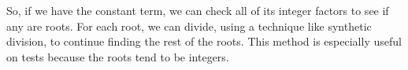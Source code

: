 \noindent
So, if we have the constant term, we can check all of its integer factors to see if any are roots. For each root, we can divide, using a technique like synthetic division, to continue finding the rest of the roots. This method is especially useful on tests because the roots tend to be integers.

